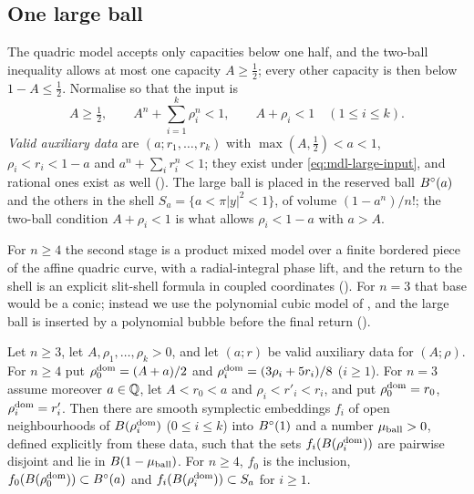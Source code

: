 \subsection{One large ball}\label{sec:mdl-lrg}

The quadric model accepts only capacities below one half, and the two-ball inequality allows at most one capacity
$A\ge\frac12$; every other capacity is then below $1-A\le\frac12$. Normalise so that the input is
\begin{equation}\label{eq:mdl-large-input}
 A\ge\tfrac12,\qquad A^n+\sum_{i=1}^k\rho_i^n<1,\qquad A+\rho_i<1\quad(1\le i\le k).
\end{equation}
\emph{Valid auxiliary data} are $(a;r_1,\dots,r_k)$ with $\max(A,\frac12)<a<1$, $\rho_i<r_i<1-a$ and
$a^n+\sum_ir_i^n<1$; they exist under \eqref{eq:mdl-large-input}, and rational ones exist as well
(). The large ball is placed in the reserved ball
$B^{\circ}(a)$ and the others in the shell $S_a=\{a<\pi|y|^2<1\}$, of volume $(1-a^n)/n!$; the two-ball condition
$A+\rho_i<1$ is what allows $\rho_i<1-a$ with $a>A$.

For $n\ge4$ the second stage is a product mixed model over a finite bordered piece of the affine quadric curve,
with a radial-integral phase lift, and the return to the shell is an explicit slit-shell formula in coupled
coordinates (). For $n=3$ that base would be a conic; instead we use the polynomial cubic
model of \cite{OpenAI2026}, and the large ball is inserted by a polynomial bubble before the final return
().

\begin{theorem}\label{thm:mdl-lrg}
Let $n\ge3$, let $A,\rho_1,\dots,\rho_k>0$, and let $(a;r)$ be valid auxiliary data for $(A;\rho)$. For $n\ge4$ put
$\rho_0^{\rm dom}=(A+a)/2$ and $\rho_i^{\rm dom}=(3\rho_i+5r_i)/8$ ($i\ge1$). For $n=3$ assume moreover $a\in\mathbb{Q}$, let
$A<r_0<a$ and $\rho_i<r'_i<r_i$, and put $\rho_0^{\rm dom}=r_0$, $\rho_i^{\rm dom}=r'_i$. Then there are smooth symplectic
embeddings $f_i$ of open neighbourhoods of $B(\rho_i^{\rm dom})$ ($0\le i\le k$) into $B^{\circ}(1)$ and a number $\mu_{\rm ball}>0$,
defined explicitly from these data, such that the sets $f_i(B(\rho_i^{\rm dom}))$ are pairwise disjoint and lie in
$B(1-\mu_{\rm ball})$. For $n\ge4$, $f_0$ is the inclusion, $f_0(B(\rho_0^{\rm dom}))\subset B^{\circ}(a)$ and
$f_i(B(\rho_i^{\rm dom}))\subset S_a$ for $i\ge1$.
\end{theorem}

